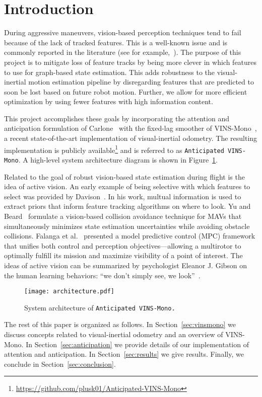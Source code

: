 
\section{Introduction}\label{sec:intro}

During aggressive maneuvers, vision-based perception techniques tend to fail because of the lack of tracked features.
This is a well-known issue and is commonly reported in the literature (see for example,~\cite{Shen2013,Falanga2017}).
The purpose of this project is to mitigate loss of feature tracks by being more clever in which features to use for graph-based state estimation.
This adds robustness to the visual-inertial motion estimation pipeline by disregarding features that are predicted to soon be lost based on future robot motion.
Further, we allow for more efficient optimization by using fewer features with high information content.

This project accomplishes these goals by incorporating the attention and anticipation formulation of Carlone~\cite{Carlone2017} with the fixed-lag smoother of VINS-Mono~\cite{Qin2018}, a recent state-of-the-art implementation of visual-inertial odometry.
The resulting implementation is publicly available\footnote{\url{https://github.com/plusk01/Anticipated-VINS-Mono}} and is referred to as \texttt{Anticipated VINS-Mono}.
A high-level system architecture diagram is shown in Figure~\ref{fig:architecture}.

Related to the goal of robust vision-based state estimation during flight is the idea of active vision.
An early example of being selective with which features to select was provided by Davison~\cite{Davison2005}.
In his work, multual information is used to extract priors that inform feature tracking algorithms on where to look.
Yu and Beard~\cite{Yu2013} formulate a vision-based collision avoidance technique for MAVs that simultaneously minimizes state estimation uncertainties while avoiding obstacle collisions.
Falanga et al.~\cite{Falanga2018} presented a model predictive control (MPC) framework that unifies both control and perception objectives---allowing a multirotor to optimally fulfill its mission and maximize visibility of a point of interest.
The ideas of active vision can be summarized by psychologist Eleanor J. Gibson on the human learning behaviors: ``we don't simply see, we look''~\cite{Gibson1988}.

\begin{figure}
\centering
\texttt{[image: architecture.pdf]} 
\caption{System architecture of \texttt{Anticipated VINS-Mono.}}
\label{fig:architecture} 
\end{figure}

The rest of this paper is organized as follows.
In Section~\ref{sec:vinsmono} we discuss concepts related to visual-inertial odometry and an overview of VINS-Mono.
In Section~\ref{sec:anticipation} we provide details of our implementation of attention and anticipation.
In Section~\ref{sec:results} we give results.
Finally, we conclude in Section~\ref{sec:conclusion}.

